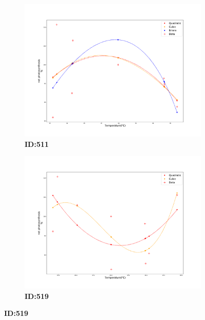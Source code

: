 \documentclass[11pt]{article}
\begin{document}
\begin{figure}
    \begin{subfigure}[t]{.5\textwidth}
      \center
      \includegraphics[width=\linewidth]{images/TPC_fitting511.pdf}
      \caption{\textbf{ID:511}}
    \end{subfigure}
    \hfill
    \begin{subfigure}[t]{.5\textwidth}
      \center
      \includegraphics[width=\linewidth]{images/TPC_fitting519.pdf}
      \caption{\textbf{ID:519}}
    \end{subfigure}
  
    \medskip


\end{figure}
\end{document}
